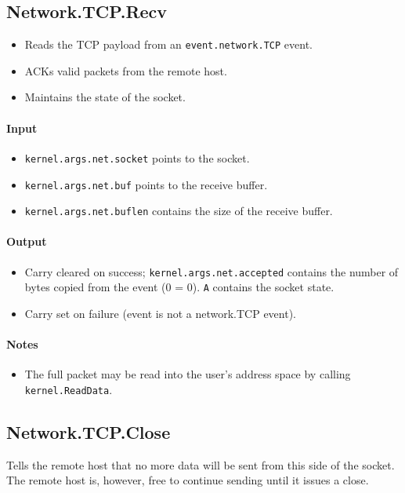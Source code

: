 \subsection*{Network.TCP.Recv}
\begin{itemize}
\item Reads the TCP payload from an \verb+event.network.TCP+ event.
\item ACKs valid packets from the remote host.
\item Maintains the state of the socket. 
\end{itemize}

\paragraph{Input}
\begin{itemize}
\item \verb+kernel.args.net.socket+ points to the socket.
\item \verb+kernel.args.net.buf+ points to the receive buffer.
\item \verb+kernel.args.net.buflen+ contains the size of the receive buffer.
\end{itemize}

\paragraph{Output}
\begin{itemize}
\item Carry cleared on success; \verb+kernel.args.net.accepted+ contains the number of bytes copied from the event (0 = 0). \verb+A+ contains the socket state.
\item Carry set on failure (event is not a network.TCP event).
\end{itemize}

\paragraph{Notes}
\begin{itemize}
\item The full packet may be read into the user's address space by calling \verb+kernel.ReadData+.
\end{itemize}

\subsection*{Network.TCP.Close}
Tells the remote host that no more data will be sent from this side of the socket.  The remote host is, however, free to continue sending until it issues a close.

